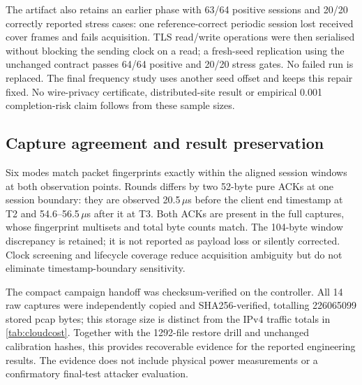 The artifact also retains an earlier phase with 63/64 positive sessions and 20/20 correctly reported stress cases: one reference-correct periodic session lost received cover frames and fails acquisition. TLS read/write operations were then serialised without blocking the sending clock on a read; a fresh-seed replication using the unchanged contract passes 64/64 positive and 20/20 stress gates. No failed run is replaced. The final frequency study uses another seed offset and keeps this repair fixed. No wire-privacy certificate, distributed-site result or empirical 0.001 completion-risk claim follows from these sample sizes.

\subsection{Capture agreement and result preservation}
Six modes match packet fingerprints exactly within the aligned session windows at both observation points. Rounds differs by two 52-byte pure ACKs at one session boundary: they are observed 20.5\,$\mu$s before the client end timestamp at T2 and 54.6--56.5\,$\mu$s after it at T3. Both ACKs are present in the full captures, whose fingerprint multisets and total byte counts match. The 104-byte window discrepancy is retained; it is not reported as payload loss or silently corrected. Clock screening and lifecycle coverage reduce acquisition ambiguity but do not eliminate timestamp-boundary sensitivity.

The compact campaign handoff was checksum-verified on the controller. All 14 raw captures were independently copied and SHA256-verified, totalling 226065099 stored pcap bytes; this storage size is distinct from the IPv4 traffic totals in \cref{tab:cloudcost}. Together with the 1292-file restore drill and unchanged calibration hashes, this provides recoverable evidence for the reported engineering results. The evidence does not include physical power measurements or a confirmatory final-test attacker evaluation.
